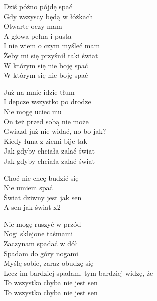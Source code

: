 \begin{text}
    Dziś późno pójdę spać\\
    Gdy wszyscy będą w łóżkach\\
    Otwarte oczy mam\\
    A głowa pełna i pusta\\
    I nie wiem o czym myśleć mam\\
    Żeby mi się przyśnił taki świat\\
    W którym się nie boję spać\\
    W którym się nie boję spać

    Już na mnie idzie tłum\\
    I depcze wszystko po drodze\\
    Nie mogę uciec mu\\
    On też przed sobą nie może\\
    Gwiazd już nie widać, no bo jak?\\
    Kiedy łuna z ziemi bije tak\\
    Jak gdyby chciała zalać świat\\
    Jak gdyby chciała zalać świat

    \vin Choć nie chcę budzić się\\
    \vin Nie umiem spać\\
    \vin Świat dziwny jest jak sen\\
    \vin A sen jak świat x2

    Nie mogę ruszyć w przód\\
    Nogi sklejone taśmami\\
    Zaczynam spadać w dół\\
    Spadam do góry nogami\\
    Myślę sobie, zaraz obudzę się\\
    Lecz im bardziej spadam, tym bardziej widzę, że\\
    To wszystko chyba nie jest sen\\
    To wszystko chyba nie jest sen
\end{text}
\begin{chord}

\end{chord}